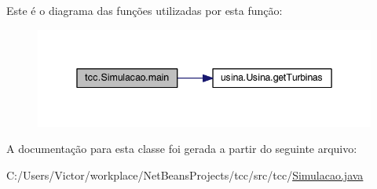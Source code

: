 Este é o diagrama das funções utilizadas por esta função\-:\nopagebreak
\begin{figure}[H]
\begin{center}
\leavevmode
\includegraphics[width=342pt]{classtcc_1_1_simulacao_a7bd0e9c7094268fe3262733ac599f17b_cgraph}
\end{center}
\end{figure}




A documentação para esta classe foi gerada a partir do seguinte arquivo\-:\begin{DoxyCompactItemize}
\item 
C\-:/\-Users/\-Victor/workplace/\-Net\-Beans\-Projects/tcc/src/tcc/\hyperlink{_simulacao_8java}{Simulacao.\-java}\end{DoxyCompactItemize}

